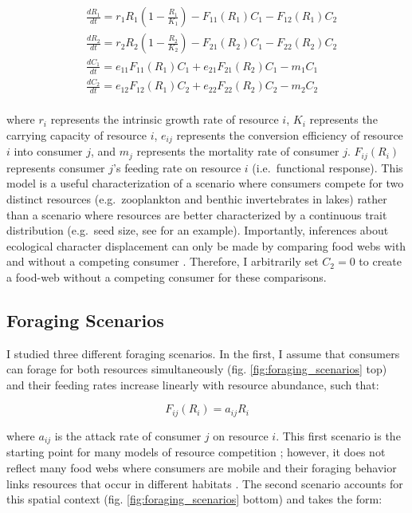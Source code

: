 \documentclass[11pt,]{article}
\begin{document}
\begin{equation} \label{eq:1}
  \begin{split}
     & \frac{dR_1}{dt}=r_1R_1(1-\frac{R_1}{K_1})-F_{11}(R_1)C_1-F_{12}(R_1)C_2 \\
     & \frac{dR_2}{dt}=r_2R_2(1-\frac{R_2}{K_2})-F_{21}(R_2)C_1-F_{22}(R_2)C_2 \\
     & \frac{dC_1}{dt}=e_{11}F_{11}(R_1)C_1+e_{21}F_{21}(R_2)C_1-m_1C_1 \\
     & \frac{dC_2}{dt}=e_{12}F_{12}(R_1)C_2+e_{22}F_{22}(R_2)C_2-m_2C_2 \\
  \end{split}
\end{equation}

where \(r_i\) represents the intrinsic growth rate of resource \(i\),
\(K_i\) represents the carrying capacity of resource \(i\), \(e_{ij}\)
represents the conversion efficiency of resource \(i\) into consumer
\(j\), and \(m_j\) represents the mortality rate of consumer \(j\).
\(F_{ij}(R_i)\) represents consumer \(j\)'s feeding rate on resource
\(i\) (i.e.~functional response). This model is a useful
characterization of a scenario where consumers compete for two distinct
resources (e.g.~zooplankton and benthic invertebrates in lakes) rather
than a scenario where resources are better characterized by a continuous
trait distribution (e.g.~seed size, see \citet{Taper1985} for an
example). Importantly, inferences about ecological character
displacement can only be made by comparing food webs with and without a
competing consumer \citep{Schluter1992}. Therefore, I arbitrarily set
\(C_2=0\) to create a food-web without a competing consumer for these
comparisons.

\subsection{Foraging Scenarios}\label{foraging-scenarios}

I studied three different foraging scenarios. In the first, I assume
that consumers can forage for both resources simultaneously (fig.
\ref{fig:foraging_scenarios} top) and their feeding rates increase
linearly with resource abundance, such that:

\begin{equation} \label{eq:2}
  F_{ij}(R_i)=a_{ij}R_i
\end{equation}

where \(a_{ij}\) is the attack rate of consumer \(j\) on resource \(i\).
This first scenario is the starting point for many models of resource
competition \citep{MacArthur1972}; however, it does not reflect many
food webs where consumers are mobile and their foraging behavior links
resources that occur in different habitats \citep{McCann2005}. The
second scenario accounts for this spatial context (fig.
\ref{fig:foraging_scenarios} bottom) and takes the form:
\end{document}
